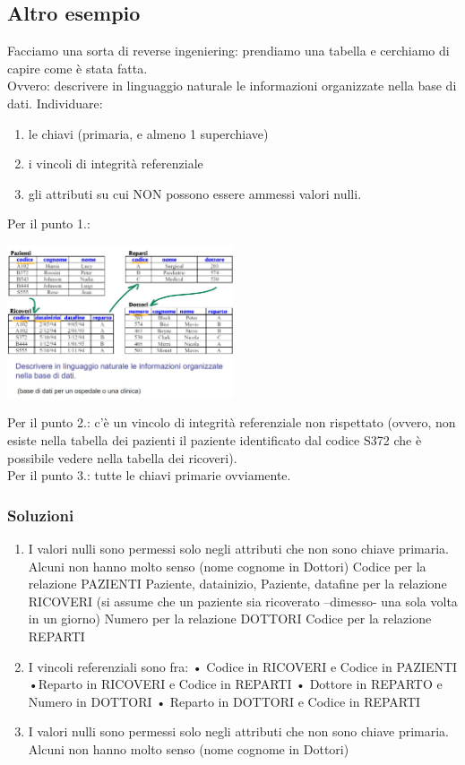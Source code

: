 \subsection{Altro esempio}
Facciamo una sorta di reverse ingeniering: prendiamo una tabella e cerchiamo di capire come è stata fatta.
\\Ovvero: descrivere in linguaggio naturale le informazioni organizzate nella base di dati. 
Individuare: 
\begin{enumerate}
    \item le chiavi (primaria, e almeno 1 superchiave)
    \item i vincoli di integrità referenziale
    \item gli attributi su cui NON possono essere ammessi valori nulli.
\end{enumerate} 
Per il punto 1.:
\begin{center}
    \includegraphics[width=0.5\textwidth]{img/MR_es_altro1.jpg}
\end{center}
Per il punto 2.: c'è un vincolo di integrità referenziale non rispettato (ovvero, non esiste nella tabella dei pazienti il paziente identificato dal codice S372 che è possibile vedere nella tabella dei ricoveri).
\\Per il punto 3.: tutte le chiavi primarie ovviamente.
\subsubsection{Soluzioni}
\begin{enumerate}
    \item I valori nulli sono permessi solo negli attributi che non sono
chiave primaria.
Alcuni non hanno molto senso (nome cognome in Dottori)
Codice per la relazione PAZIENTI
{Paziente, datainizio}, {Paziente, datafine} per la relazione RICOVERI (si
assume che un paziente sia ricoverato –dimesso- una sola volta in un
giorno)
Numero per la relazione DOTTORI
Codice per la relazione REPARTI
\item
I vincoli referenziali sono fra:
• Codice in RICOVERI e Codice in PAZIENTI
•Reparto in RICOVERI e Codice in REPARTI
• Dottore in REPARTO e Numero in DOTTORI
• Reparto in DOTTORI e Codice in REPARTI
    \item I valori nulli sono permessi solo negli attributi che non sono chiave primaria. Alcuni non hanno molto senso (nome cognome in Dottori)
\end{enumerate}

